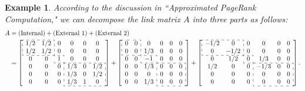 \documentclass[11pt,draftcls,onecolumn]{IEEEtran}
\newtheorem{example}[theorem]{Example}
\begin{document}
\begin{example}
According to the discussion in ``Approximated PageRank Computation," 
we can decompose the link matrix $A$ into three parts as follows:
\vspace*{-2mm}
{\small
\begin{align*}
 A &= \text{(Internal)} + \text{(External 1)} + \text{(External 2)}\\
  &= \left[
     \begin{array}{cccccc}
      \cdashline{1-2}
      \multicolumn{1}{:c}{1/2} & \multicolumn{1}{c:}{1/2}  &  0  & 0 &  0  &  0\\
      \multicolumn{1}{:c}{1/2}  & \multicolumn{1}{c:}{1/2} &  0  & 0 &  0  &  0\\
      \cdashline{1-3}
         0 &  0   &  \multicolumn{1}{:c:}{1}  & 0 &  0  &  0\\
      \cdashline{3-6}
         0 &  0   &  0  & \multicolumn{1}{:c}{1/3} & 0 & \multicolumn{1}{c:}{1/2}\\
         0 &  0   &  0  & \multicolumn{1}{:c}{1/3} & 0 & \multicolumn{1}{c:}{1/2}\\
         0 &  0   &  0  & \multicolumn{1}{:c}{1/3} &  1 & \multicolumn{1}{c:}{0} \\
      \cdashline{4-6}
     \end{array}
    \right]
   + 
    \left[
     \begin{array}{cccccc}
      \cdashline{1-2}
      \multicolumn{1}{:c}{0} &  \multicolumn{1}{c:}{0}  &  0   &  0   &  0  &  0\\
      \multicolumn{1}{:c}{0}   & \multicolumn{1}{c:}{0} &  1/3 &  0   &  0  &  0\\
      \cdashline{1-3}
       0   & 0 & \multicolumn{1}{:c:}{-1}   &  0 &  0  &  0\\   
      \cdashline{3-6}
         0 &  0   &  1/3 & \multicolumn{1}{:c}{0} &  0  & \multicolumn{1}{c:}{0}\\   
         0 &  0   &  0   & \multicolumn{1}{:c}{0}    &  0  & \multicolumn{1}{c:}{0}\\
         0 &  0   &  1/3 & \multicolumn{1}{:c}{0}    &  0  & \multicolumn{1}{c:}{0}\\
      \cdashline{4-6}
     \end{array}
    \right]
    + 
    \left[
     \begin{array}{cccccc}
      \cdashline{1-2}
      \multicolumn{1}{:c}{-1/2} &  \multicolumn{1}{c:}{0}  &  0   &  0   &  0  &  0\\
      \multicolumn{1}{:c}{0}   & \multicolumn{1}{c:}{-1/2} &  0   &  0   &  0  &  0\\
      \cdashline{1-3}
       0   & 1/2 & \multicolumn{1}{:c:}{0}   &  1/3 &  0  &  0\\   
      \cdashline{3-6}
       1/2 &  0   &  0 & \multicolumn{1}{:c}{-1/3} &  0  & \multicolumn{1}{c:}{0}\\   
         0 &  0   &  0   & \multicolumn{1}{:c}{0}    &  0  & \multicolumn{1}{c:}{0}\\
         0 &  0   &  0 & \multicolumn{1}{:c}{0}    &  0  & \multicolumn{1}{c:}{0}\\
      \cdashline{4-6}
     \end{array}
    \right].
\end{align*}}


\end{example}
\end{document}
